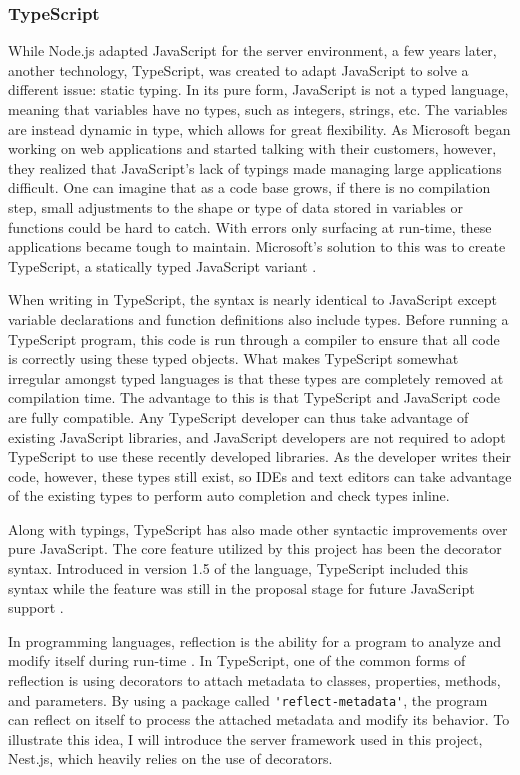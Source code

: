 \subsubsection{TypeScript} \label{sec:typescript}
While Node.js adapted JavaScript for the server environment, a few years later, another technology, TypeScript, was created to adapt JavaScript to solve a different issue: static typing.  In its pure form, JavaScript is not a typed language, meaning that variables have no types, such as integers, strings, etc.  The variables are instead dynamic in type, which allows for great flexibility.  As Microsoft began working on web applications and started talking with their customers, however, they realized that JavaScript's lack of typings made managing large applications difficult.  One can imagine that as a code base grows, if there is no compilation step, small adjustments to the shape or type of data stored in variables or functions could be hard to catch.  With errors only surfacing at run-time, these applications became tough to maintain.  Microsoft's solution to this was to create TypeScript, a statically typed JavaScript variant \cite{idgnewsservicestaffMicrosoftAugmentsJavaScript2012}.

When writing in TypeScript, the syntax is nearly identical to JavaScript except variable declarations and function definitions also include types.  Before running a TypeScript program, this code is run through a compiler to ensure that all code is correctly using these typed objects. What makes TypeScript somewhat irregular amongst typed languages is that these types are completely removed at compilation time. The advantage to this is that TypeScript and JavaScript code are fully compatible.  Any TypeScript developer can thus take advantage of existing JavaScript libraries, and JavaScript developers are not required to adopt TypeScript to use these recently developed libraries.  As the developer writes their code, however, these types still exist, so IDEs and text editors can take advantage of the existing types to perform auto completion and check types inline.

Along with typings, TypeScript has also made other syntactic improvements over pure JavaScript.  The core feature utilized by this project has been the decorator syntax.  Introduced in version 1.5 of the language, TypeScript included this syntax while the feature was still in the proposal stage for future JavaScript support \cite{turnerAnnouncingTypeScript2015}.

In programming languages, reflection is the ability for a program to analyze and modify itself during run-time \cite{malenfantTutorialBehavioralReflection1996}.  In TypeScript, one of the common forms of reflection is using decorators to attach metadata to classes, properties, methods, and parameters.  By using a package called \Verb!'reflect-metadata'!, the program can reflect on itself to process the attached metadata and modify its behavior.  To illustrate this idea, I will introduce the server framework used in this project, Nest.js, which heavily relies on the use of decorators.

